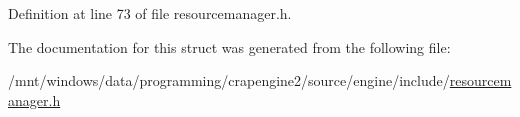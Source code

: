 Definition at line 73 of file resourcemanager.\+h.



The documentation for this struct was generated from the following file\+:\begin{DoxyCompactItemize}
\item 
/mnt/windows/data/programming/crapengine2/source/engine/include/\hyperlink{resourcemanager_8h}{resourcemanager.\+h}\end{DoxyCompactItemize}
